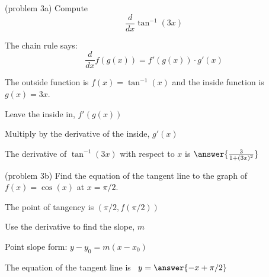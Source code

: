 \documentclass[handout]{ximera}
\begin{document}
\begin{problem}(problem 3a)
  Compute
  \[
  \frac{d}{dx} \tan^{-1}(3x)
  \]
  
    \begin{hint}
      The chain rule says:
      \[
      \frac{d}{dx} f(g(x)) = f'(g(x))\cdot g'(x)
      \]
    \end{hint}
    \begin{hint}
      The outside function is $f(x) = \tan^{-1}(x)$ and the inside
      function is $g(x) = 3x$.
    \end{hint}
    \begin{hint}
		  Leave the inside in, $f'(g(x))$
		\end{hint}
		\begin{hint}
		  Multiply by the derivative of the inside, $g'(x)$
		\end{hint}
    
		The derivative of $\tan^{-1}(3x)$ with respect to $x$ is
		 $\answer{\frac{3}{1+(3x)^2}}$
		
\end{problem}



\begin{problem}(problem 3b)
Find the equation of the tangent line to the graph of $f(x) = \cos(x)$ at $x=\pi/2.$


\begin{hint}
The point of tangency is $(\pi/2, f(\pi/2))$
\end{hint}
\begin{hint}
Use the derivative to find the slope, $m$
\end{hint}
\begin{hint}
Point slope form: $y-y_0 = m(x-x_0)$
\end{hint}

The equation of the tangent line is \ $y = \answer{-x + \pi/2}$

\end{problem}
\end{document}

